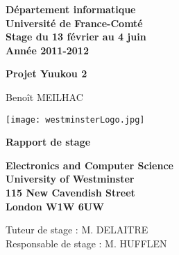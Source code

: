 \begin{titlepage}
    \centering

    \vspace{5mm}

	\normalsize{
		\textbf{
			D\'epartement informatique\\
			Universit\'e de France-Comt\'e\\
			Stage du 13 f\'evrier au 4 juin\\
			Ann\'ee 2011-2012
		}
	}

    \vspace{5mm}
	
    \Huge{
        \textbf{
            Projet Yuukou 2
        }
    }

    \vspace{5mm}

    \normalsize{
        Beno\^it MEILHAC
    }

    \vspace{5mm}
	
    \begin{center} 
        \texttt{[image: westminsterLogo.jpg]}
	\end{center}
	
    \vspace{14mm}

    \Huge{
        \textbf{
            Rapport de stage
        }
	}

	\vspace{20mm}

    \normalsize{
        \textbf{
			Electronics and Computer Science\\
            University of Westminster\\
        	115 New Cavendish Street\\
			London W1W 6UW\\
        }
    }

	\vspace{5mm}

	\normalsize{	
	    Tuteur de stage : M. DELAITRE\\
		Responsable de stage : M. HUFFLEN
	}

\end{titlepage}

\clearpage

